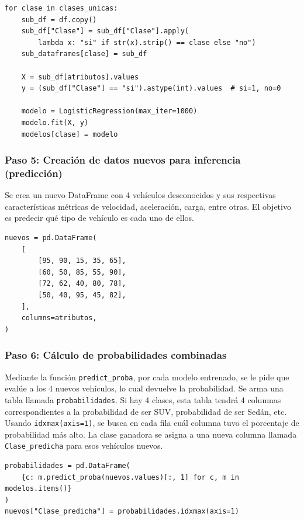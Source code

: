 \documentclass[]{article}
\begin{document}
\begin{lstlisting}
for clase in clases_unicas:
    sub_df = df.copy()
    sub_df["Clase"] = sub_df["Clase"].apply(
        lambda x: "si" if str(x).strip() == clase else "no")
    sub_dataframes[clase] = sub_df

    X = sub_df[atributos].values
    y = (sub_df["Clase"] == "si").astype(int).values  # si=1, no=0

    modelo = LogisticRegression(max_iter=1000)
    modelo.fit(X, y)
    modelos[clase] = modelo
\end{lstlisting}

\subsubsection*{Paso 5: Creación de datos nuevos para inferencia (predicción)}

Se crea un nuevo DataFrame con 4 vehículos desconocidos y sus respectivas características métricas de velocidad, aceleración, carga, entre otras. El objetivo es predecir qué tipo de vehículo es cada uno de ellos.

\begin{lstlisting}
nuevos = pd.DataFrame(
    [
        [95, 90, 15, 35, 65],
        [60, 50, 85, 55, 90],
        [72, 62, 40, 80, 78],
        [50, 40, 95, 45, 82],
    ],
    columns=atributos,
)
\end{lstlisting}

\subsubsection*{Paso 6: Cálculo de probabilidades combinadas}

Mediante la función \texttt{predict\_proba}, por cada modelo entrenado, se le pide que evalúe a los 4 nuevos vehículos, lo cual devuelve la probabilidad. Se arma una tabla llamada \texttt{probabilidades}. Si hay 4 clases, esta tabla tendrá 4 columnas correspondientes a la probabilidad de ser SUV, probabilidad de ser Sedán, etc. Usando \texttt{idxmax(axis=1)}, se busca en cada fila cuál columna tuvo el porcentaje de probabilidad más alto. La clase ganadora se asigna a una nueva columna llamada \texttt{Clase\_predicha} para esos vehículos nuevos.

\begin{lstlisting}
probabilidades = pd.DataFrame(
    {c: m.predict_proba(nuevos.values)[:, 1] for c, m in modelos.items()}
)
nuevos["Clase_predicha"] = probabilidades.idxmax(axis=1)
\end{lstlisting}
\end{document}
